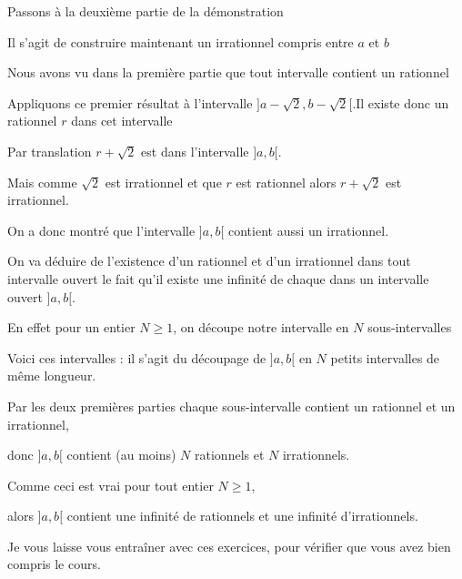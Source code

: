 \diapo

Passons à la deuxième partie de la démonstration

\change

Il s'agit de construire maintenant un irrationnel compris entre $a$ et $b$

\change

Nous avons vu dans la première partie que tout intervalle contient un rationnel

\change

Appliquons ce premier résultat 
à l'intervalle $]a-\sqrt{2},b-\sqrt{2}[$.Il existe donc un 
rationnel $r$ dans cet intervalle

\change

Par translation $r+\sqrt{2}$ est dans l'intervalle $]a,b[$. 

Mais comme $\sqrt 2$ est irrationnel et que $r$ est rationnel alors $r+\sqrt{2}$ est irrationnel.

On a donc montré que l'intervalle $]a,b[$ contient aussi un irrationnel.

\change


On va déduire de l'existence d'un rationnel et d'un irrationnel 
dans tout intervalle ouvert le fait qu'il existe une infinité 
de chaque dans un intervalle ouvert $]a,b[$. 

\change

En effet pour un entier $N\geq 1$, 
 on découpe notre intervalle en $N$ sous-intervalles

\change

Voici ces intervalles : il s'agit du découpage de $]a,b[$ en $N$ petits intervalles
de même longueur.

\change

Par les deux premières parties chaque sous-intervalle contient un rationnel et un irrationnel, 

\change

donc $]a,b[$ contient (au moins) $N$ rationnels et $N$ irrationnels. 

\change

Comme ceci est vrai pour tout entier $N\geq 1$, 

\change

alors $]a,b[$ contient 
une infinité de rationnels et une infinité d'irrationnels.

\diapo

Je vous laisse vous entraîner avec ces exercices, 
pour vérifier que vous avez bien compris le cours.


